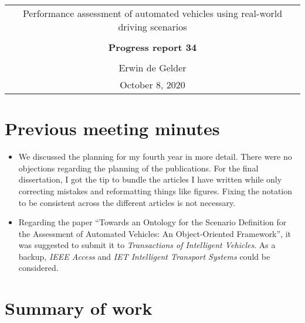 \documentclass[10pt,final,a4paper,oneside,onecolumn]{article}
\newcommand{\progressreportnumber}{34}
\renewcommand{\author}{Erwin de Gelder}
\renewcommand{\date}{October 8, 2020}
\renewcommand{\title}{Performance assessment of automated vehicles using real-world driving scenarios}
\begin{document}
	
\begin{center}
	\begin{tabular}{c}
		\title \\ \\
		\textbf{\huge Progress report \progressreportnumber} \\ \\
		\author \\ 
		\date
	\end{tabular}
\end{center}

\section{Previous meeting minutes}

\begin{itemize}
	\item We discussed the planning for my fourth year in more detail. There were no objections regarding the planning of the publications. For the final dissertation, I got the tip to bundle the articles I have written while only correcting mistakes and reformatting things like figures. Fixing the notation to be consistent across the different articles is not necessary.
	
	\item Regarding the paper ``Towards an Ontology for the Scenario Definition for the Assessment of Automated Vehicles: An Object-Oriented Framework'', it was suggested to submit it to \emph{Transactions of Intelligent Vehicles}. As a backup, \emph{IEEE Access} and \emph{IET Intelligent Transport Systems} could be considered.
\end{itemize}

\section{Summary of work}
\end{document}

